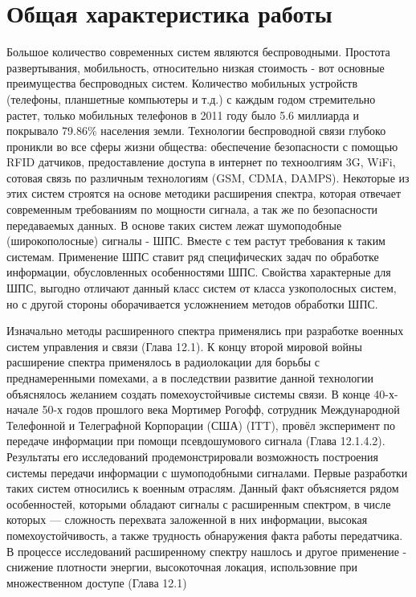 \section*{Общая характеристика работы}

Большое количество современных систем являются беспроводными. Простота развертывания, мобильность, относительно низкая
стоимость - вот основные преимущества беспроводных систем. Количество мобильных устройств (телефоны, планшетные компьютеры
и т.д.) с каждым годом стремительно растет, только мобильных телефонов в 2011 году было 5.6 миллиарда и покрывало 79.86\%
\cite{wiki_mobilenum} населения земли. Технологии беспроводной связи глубоко проникли во все сферы жизни общества:
обеспечение безопасности с помощью RFID датчиков, предоставление доступа в интернет по техноолгиям 3G, WiFi, 
сотовая связь по различным технологиям (GSM, CDMA, DAMPS). Некоторые из этих систем строятся на основе методики
расширения спектра, которая отвечает современным требованиям по мощности сигнала, а так же по безопасности передаваемых
данных. В основе таких систем лежат шумоподобные (широкополосные) сигналы - ШПС. Вместе с тем растут требования к таким
системам. Применение ШПС ставит ряд специфических задач по обработке информации, обусловленных особенностями ШПС.
Свойства характерные для ШПС, выгодно отличают данный класс систем от класса узкополосных систем, но с другой стороны
оборачивается усложнением методов обработки ШПС.

Изначально методы расширенного спектра применялись при разработке военных систем управления и связи \cite{sklyar} (Глава 12.1).
К концу второй мировой войны расширение спектра применялось в радиолокации для борьбы с преднамеренными помехами, а
в последствии развитие данной технологии объяснялось желанием создать помехоустойчивые системы связи.
В конце 40-х-начале 50-х годов прошлого века Мортимер Рогофф, сотрудник Международной Телефонной и Телеграфной Корпорации (США) (ITT),
провёл эксперимент по передаче информации при помощи псевдошумового сигнала \cite{sklyar} (Глава 12.1.4.2).
Результаты его исследований продемонстрировали возможность построения системы передачи информации с шумоподобными сигналами.
Первые разработки таких систем относились к военным отраслям. Данный факт объясняется рядом особенностей, которыми обладают
сигналы с расширенным спектром, в числе которых — сложность перехвата заложенной в них информации,
высокая помехоустойчивость, а также трудность обнаружения факта работы передатчика. В процессе исследований расширенному спектру
нашлось и другое применение - снижение плотности энергии, высокоточная локация, использовние при множественном доступе
\cite{sklyar} (Глава 12.1)

